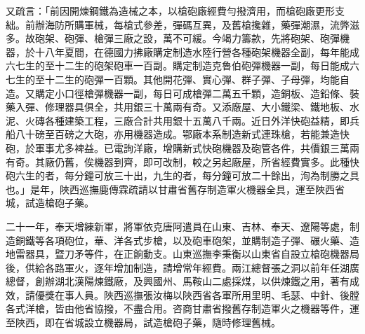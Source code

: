 \begin{pinyinscope}
又疏言：「前因開煉鋼鐵為造械之本，以槍砲廠經費勻撥濟用，而槍砲廠更形支絀。前辦海防所購軍械，每槍式參差，彈碼互異，及舊槍攙雜，藥彈潮濕，流弊滋多。故砲架、砲彈、槍彈三廠之設，萬不可緩。今竭力籌款，先將砲架、砲彈機器，於十八年夏間，在德國力拂廠購定制造水陸行營各種砲架機器全副，每年能成六七生的至十二生的砲架砲車一百副。購定制造克魯伯砲彈機器一副，每日能成六七生的至十二生的砲彈一百顆。其他開花彈、實心彈、群子彈、子母彈，均能自造。又購定小口徑槍彈機器一副，每日可成槍彈二萬五千顆，造銅板、造鉛條、裝藥入彈、修理器具俱全，共用銀三十萬兩有奇。又添廠屋、大小鐵梁、鐵地板、水泥、火磚各種建築工程，三廠合計共用銀十五萬八千兩。近日外洋快砲益精，即兵船八十磅至百磅之大砲，亦用機器造成。鄂廠本系制造新式連珠槍，若能兼造快砲，於軍事尤多裨益。已電詢洋廠，增購新式快砲機器及砲管各件，共價銀三萬兩有奇。其廠仍舊，俟機器到齊，即可改制，較之另起廠屋，所省經費實多。此種快砲六生的者，每分鐘可放三十出，九生的者，每分鐘可放二十餘出，洵為制勝之具也。」是年，陜西巡撫鹿傳霖疏請以甘肅省舊存制造軍火機器全具，運至陜西省城，試造槍砲子藥。

二十一年，奉天增練新軍，將軍依克唐阿遣員在山東、吉林、奉天、遼陽等處，制造銅鐵等各項砲位，華、洋各式步槍，以及砲車砲架，並購制造子彈、碾火藥、造地雷器具，暨刀矛等件，在正餉動支。山東巡撫李秉衡以山東省自設立槍砲機器局後，供給各路軍火，逐年增加制造，請增常年經費。兩江總督張之洞以前年任湖廣總督，創辦湖北漢陽煉鐵廠，及興國州、馬鞍山二處採煤，以供煉鐵之用，著有成效，請優獎在事人員。陜西巡撫張汝梅以陜西省各軍所用里明、毛瑟、中針、後膛各式洋槍，皆由他省協撥，不盡合用。咨商甘肅省撥舊存制造軍火之機器等件，運至陜西，即在省城設立機器局，試造槍砲子藥，隨時修理舊械。


\end{pinyinscope}
